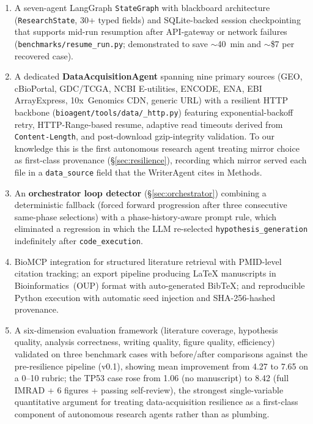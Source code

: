 \documentclass[11pt]{article}
\begin{document}
\begin{enumerate}
  \item A seven-agent LangGraph \texttt{StateGraph} with blackboard
        architecture (\texttt{ResearchState}, 30+ typed fields) and
        SQLite-backed session checkpointing that supports mid-run
        resumption after API-gateway or network failures
        (\texttt{benchmarks/resume\_run.py}; demonstrated to save
        $\sim$40~min and $\sim$\$7 per recovered case).
  \item A dedicated \textbf{DataAcquisitionAgent} spanning nine
        primary sources (GEO, cBioPortal, GDC/TCGA, NCBI E-utilities,
        ENCODE, ENA, EBI ArrayExpress, 10x~Genomics CDN, generic URL)
        with a resilient HTTP backbone
        (\texttt{bioagent/tools/data/\_http.py}) featuring
        exponential-backoff retry, HTTP-Range-based resume, adaptive
        read timeouts derived from \texttt{Content-Length}, and
        post-download gzip-integrity validation. To our knowledge this
        is the first autonomous research agent treating mirror choice
        as first-class provenance (\S\ref{sec:resilience}), recording
        which mirror served each file in a \texttt{data\_source} field
        that the WriterAgent cites in Methods.
  \item An \textbf{orchestrator loop detector} (\S\ref{sec:orchestrator})
        combining a deterministic fallback (forced forward progression
        after three consecutive same-phase selections) with a
        phase-history-aware prompt rule, which eliminated a regression
        in which the LLM re-selected
        \texttt{hypothesis\_generation} indefinitely after
        \texttt{code\_execution}.
  \item BioMCP integration for structured literature retrieval with
        PMID-level citation tracking; an export pipeline producing
        \LaTeX{} manuscripts in Bioinformatics~(OUP) format with
        auto-generated BibTeX; and reproducible Python execution with
        automatic seed injection and SHA-256-hashed provenance.
  \item A six-dimension evaluation framework (literature coverage,
        hypothesis quality, analysis correctness, writing quality,
        figure quality, efficiency) validated on three benchmark cases
        with before/after comparisons against the pre-resilience
        pipeline (v0.1), showing mean improvement from 4.27 to 7.65 on
        a 0--10 rubric; the TP53 case rose from 1.06 (no manuscript)
        to 8.42 (full IMRAD + 6 figures + passing self-review), the
        strongest single-variable quantitative argument for treating
        data-acquisition resilience as a first-class component of
        autonomous research agents rather than as plumbing.
\end{enumerate}
\end{document}
